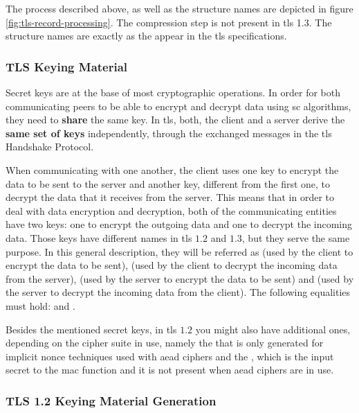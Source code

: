 \documentclass{llncs}
\begin{document}
The process described above, as well as the structure names are depicted in figure \ref{fig:tls-record-processing}.
The compression step is not present in \gls{tls} 1.3. The structure names are exactly as the appear in the \gls{tls} specifications.

\subsubsection{TLS Keying Material}

Secret keys are at the base of most cryptographic operations.
In order for both communicating peers to be able to encrypt and decrypt data
using \gls{sc} algorithms, they need to \textbf{share} the same key. In \gls{tls}, both, the client and a server derive the \textbf{same set of keys}
independently, through the exchanged messages in the \gls{tls} Handshake Protocol.

When communicating with one another, the client uses one key to
encrypt the data to be sent to the server and another key, different from the first one, to decrypt the data
that it receives from the server. This means that in order to deal with data
encryption and decryption, both of the communicating entities have two keys:
one to encrypt the outgoing data and one to decrypt the incoming data. Those keys
have different names in \gls{tls} $1.2$ and $1.3$, but they serve the same
purpose. In this general description, they will be referred as 
(used by the client to encrypt the data to be sent), (used by the client to
decrypt the incoming data from the server), (used by the server to encrypt
the data to be sent) and (used by the server to decrypt the incoming
data from the client). The following equalities must hold:
 and .

Besides the mentioned secret keys, in \gls{tls} $1.2$ you might also have additional ones,
depending on the cipher suite in use, namely the  that
is only generated for implicit nonce techniques used with \gls{aead} ciphers and the
, which is the input secret to the \gls{mac}
function and it is not present when \gls{aead} ciphers are in use.

\subsubsection{TLS 1.2 Keying Material Generation}
\end{document}
